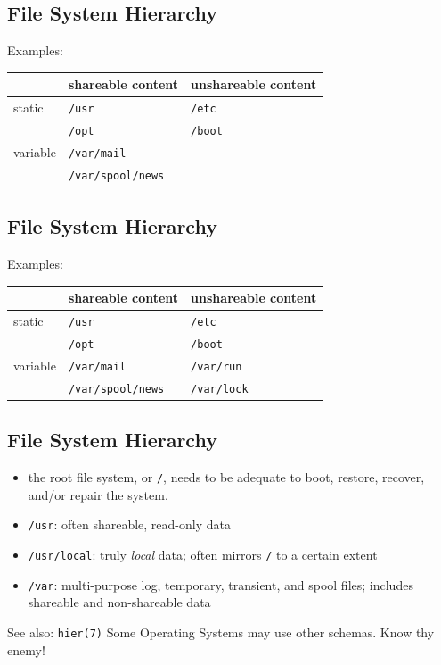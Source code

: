 \documentclass[xga]{xdvislides}
\begin{document}
\subsection{File System Hierarchy}
Examples:
\\

\begin{center}
\begin{tabular}{| l | l | l |}
	\hline
	& shareable content & unshareable content \\
	\hline
	static   & \verb+/usr+ & \verb+/etc+ \\
	         & \verb+/opt+ & \verb+/boot+ \\
	\hline
	variable & \verb+/var/mail+ & \\
	         & \verb+/var/spool/news+ & \\
	\hline
\end{tabular}
\end{center}

\subsection{File System Hierarchy}
Examples:
\\

\begin{center}
\begin{tabular}{| l | l | l |}
	\hline
	& shareable content & unshareable content \\
	\hline
	static   & \verb+/usr+ & \verb+/etc+ \\
	         & \verb+/opt+ & \verb+/boot+ \\
	\hline
	variable & \verb+/var/mail+ & \verb+/var/run+ \\
	         & \verb+/var/spool/news+ & \verb+/var/lock+ \\
	\hline
\end{tabular}
\end{center}



\subsection{File System Hierarchy}
\begin{itemize}
	\item the root file system, or \verb+/+, needs to be adequate
		to boot, restore, recover, and/or repair the system.
	\item \verb+/usr+: often shareable, read-only data
	\item \verb+/usr/local+: truly {\em local} data; often mirrors
		\verb+/+ to a certain extent
	\item \verb+/var+: multi-purpose log, temporary, transient, and spool
		files; includes shareable and non-shareable data
\end{itemize}
See also: {\tt hier(7)}
\vspace{.5in}
Some Operating Systems may use other schemas.  Know thy enemy!
\end{document}

